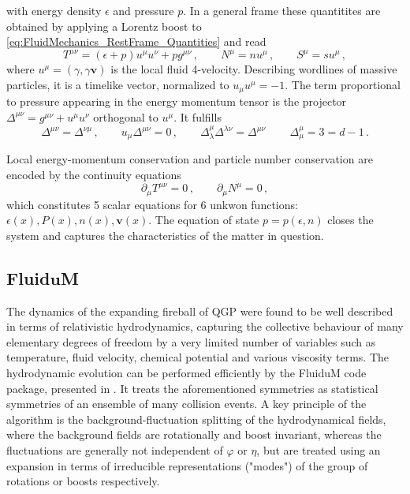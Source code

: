 with energy density $\epsilon$ and pressure $p$.  In a general frame these quantitites are obtained by applying a Lorentz boost to \eqref{eq:FluidMechanics_RestFrame_Quantities} and read \cite{Rischke_2022,Weinberg_2008}
\begin{equation}
        T^{\mu\nu}=(\epsilon+p)u^\mu u^\nu+pg^{\mu\nu}\,,\qquad
        N^\mu       =nu^\mu\,,\qquad
        S^\mu       =su^\mu\,,
    \end{equation}
where $u^\mu=(\gamma,\gamma\mathbf{v})$ is the local fluid 4-velocity. Describing wordlines of massive particles, it is a timelike vector, normalized to ${u_\mu u^\mu=-1}$. The term proportional to pressure appearing in the energy momentum tensor is the projector ${\Delta^{\mu\nu}=g^{\mu\nu}+u^\mu u^\nu}$ orthogonal to $u^\mu$. It fulfills
\begin{equation}
    \Delta^{\mu\nu}=\Delta^{\nu\mu}\,,\qquad u_\mu\Delta^{\mu\nu}=0\,,\qquad\Delta^\mu_\lambda\Delta^{\lambda\nu}=\Delta^{\mu\nu}\,\qquad\Delta^\mu_\mu=3=d-1\,.
    \label{eq:FluidMechanics_ProjProperties}
\end{equation}

Local energy-momentum conservation and particle number conservation are encoded by the continuity equations
    \begin{equation}
        \partial_\mu T^{\mu\nu}  =0\,,\qquad
        \partial_\mu N^\mu       =0\,,
    \end{equation}
which constitutes 5 scalar equations for 6 unkwon functions: $\epsilon(x), P(x), n(x), \mathbf{v}(x)$. The equation of state $p=p(\epsilon,n)$ closes the system and captures the characteristics of the matter in question.




\subsection{Fluid$\mathbf{u}$M}

The dynamics of the expanding fireball of QGP were found to be well described in terms of relativistic hydrodynamics, capturing the collective behaviour of many elementary degrees of freedom by a very limited number of variables such as temperature, fluid velocity, chemical potential and various viscosity terms. The hydrodynamic evolution can be performed efficiently by the FluiduM code package, presented in \cite{FloerchingerEtAl_2019}. It treats the aforementioned symmetries as statistical symmetries of an ensemble of many collision events. A key principle of the algorithm is the background-fluctuation splitting of the hydrodynamical fields, where the background fields are rotationally and boost invariant, whereas the fluctuations are generally not independent of $\varphi$ or $\eta$, but are treated using an expansion in terms of irreducible representations ("modes") of the group of rotations or boosts respectively.

